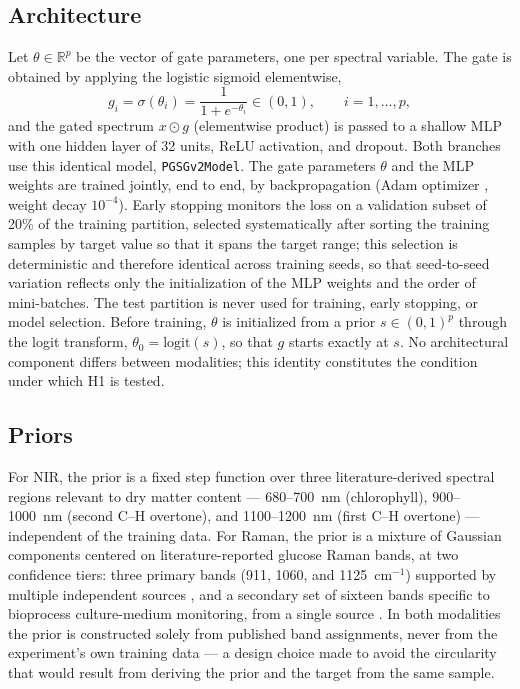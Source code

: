 \documentclass[preprint,12pt]{elsarticle}
\begin{document}
\subsection{Architecture}
\label{sec:architecture}

Let $\theta\in\mathbb{R}^{p}$ be the vector of gate parameters, one per spectral variable. The gate is obtained by applying the logistic sigmoid elementwise,
\begin{equation}
g_i=\sigma(\theta_i)=\frac{1}{1+e^{-\theta_i}}\in(0,1), \qquad i=1,\dots,p,
\label{eq:gate}
\end{equation}
and the gated spectrum $x\odot g$ (elementwise product) is passed to a shallow MLP with one hidden layer of 32 units, ReLU activation, and dropout. Both branches use this identical model, \texttt{PGSGv2Model}. The gate parameters $\theta$ and the MLP weights are trained jointly, end to end, by backpropagation (Adam optimizer \cite{kingma2015adam}, weight decay $10^{-4}$). Early stopping monitors the loss on a validation subset of 20\% of the training partition, selected systematically after sorting the training samples by target value so that it spans the target range; this selection is deterministic and therefore identical across training seeds, so that seed-to-seed variation reflects only the initialization of the MLP weights and the order of mini-batches. The test partition is never used for training, early stopping, or model selection. Before training, $\theta$ is initialized from a prior $s\in(0,1)^{p}$ through the logit transform, $\theta_0=\mathrm{logit}(s)$, so that $g$ starts exactly at $s$. No architectural component differs between modalities; this identity constitutes the condition under which H1 is tested.

\subsection{Priors}
\label{sec:priors}

For NIR, the prior is a fixed step function over three literature-derived spectral regions relevant to dry matter content --- 680--700~nm (chlorophyll), 900--1000~nm (second C--H overtone), and 1100--1200~nm (first C--H overtone) \cite{saranwong2004} --- independent of the training data. For Raman, the prior is a mixture of Gaussian components centered on literature-reported glucose Raman bands, at two confidence tiers: three primary bands (911, 1060, and 1125~cm$^{-1}$) supported by multiple independent sources \cite{lyu2012,kang2020}, and a secondary set of sixteen bands specific to bioprocess culture-medium monitoring, from a single source \cite{uspatent2024}. In both modalities the prior is constructed solely from published band assignments, never from the experiment's own training data --- a design choice made to avoid the circularity that would result from deriving the prior and the target from the same sample.
\end{document}
